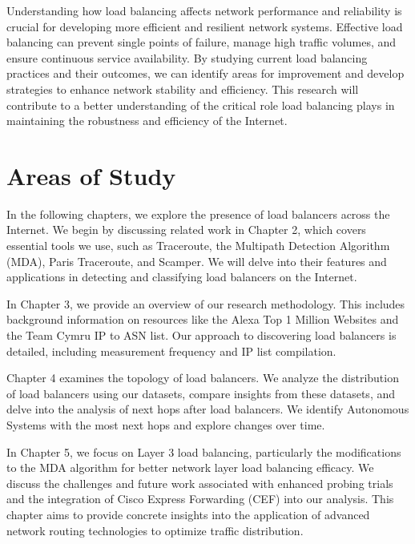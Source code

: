 \documentclass[12pt]{cwru_thesis}
\begin{document}
Understanding how load balancing affects network performance and reliability is crucial for developing more efficient and resilient network systems. Effective load balancing can prevent single points of failure, manage high traffic volumes, and ensure continuous service availability. By studying current load balancing practices and their outcomes, we can identify areas for improvement and develop strategies to enhance network stability and efficiency. This research will contribute to a better understanding of the critical role load balancing plays in maintaining the robustness and efficiency of the Internet.





\section{Areas of Study}

In the following chapters, we explore the presence of load balancers across the Internet. We begin by discussing related work in Chapter 2, which covers essential tools we use, such as Traceroute, the Multipath Detection Algorithm (MDA), Paris Traceroute, and Scamper. We will delve into their features and applications in detecting and classifying load balancers on the Internet.

In Chapter 3, we provide an overview of our research methodology. This includes background information on resources like the Alexa Top 1 Million Websites and the Team Cymru IP to ASN list. Our approach to discovering load balancers is detailed, including measurement frequency and IP list compilation.

Chapter 4 examines the topology of load balancers. We analyze the distribution of load balancers using our datasets, compare insights from these datasets, and delve into the analysis of next hops after load balancers. We identify Autonomous Systems with the most next hops and explore changes over time.

In Chapter 5, we focus on Layer 3 load balancing, particularly the modifications to the MDA algorithm for better network layer load balancing efficacy. We discuss the challenges and future work associated with enhanced probing trials and the integration of Cisco Express Forwarding (CEF) into our analysis. This chapter aims to provide concrete insights into the application of advanced network routing technologies to optimize traffic distribution.
\end{document}
